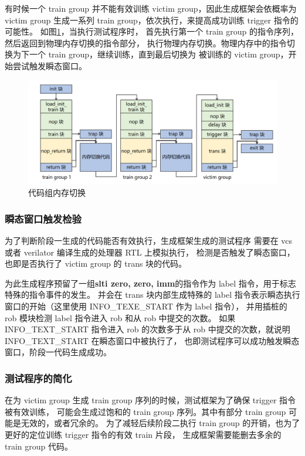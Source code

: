 有时候一个 train group 并不能有效训练 victim group，因此生成框架会依概率为 victim group
生成一系列 train group，依次执行，来提高成功训练 trigger 指令的可能性。
如图\ref{paper:memory-switch}，当执行测试程序时，
首先执行第一个 train group 的指令序列，然后返回到物理内存切换的指令部分，
执行物理内存切换。物理内存中的指令切换为下一个 train group，继续训练，直到最后切换为
被训练的 victim group，开始尝试触发瞬态窗口。\par

\begin{figure}[!h]
    \centering
    \includegraphics[width=\linewidth]{figure/paper/group-switch.png}
    \caption{代码组内存切换}
    \label{paper:memory-switch}
\end{figure}

\subsubsection{瞬态窗口触发检验}

为了判断阶段一生成的代码能否有效执行，生成框架生成的测试程序
需要在 vcs 或者 verilator 编译生成的处理器 RTL 上模拟执行，
检测是否触发了瞬态窗口，也即是否执行了 victim group 的 trans 块的代码。\par

为此生成程序预留了一组\textbf{slti zero, zero, imm}的指令作为 label 指令，用于标志特殊的指令事件的发生。
并会在 trans 块内部生成特殊的 label 指令表示瞬态执行窗口的开始（这里使用 INFO\_TEXE\_START 作为 label 指令），
并用插桩的 rob 模块检测 label 指令进入 rob 和从 rob 中提交的次数。
如果 INFO\_TEXT\_START 指令进入 rob 的次数多于从 rob 中提交的次数，就说明 INFO\_TEXT\_START 在瞬态窗口中被执行了，
也即测试程序可以成功触发瞬态窗口，阶段一代码生成成功。

\subsubsection{测试程序的简化}

在为 victim group 生成 train group 序列的时候，测试框架为了确保 trigger 指令被有效训练，
可能会生成过饱和的 train group 序列。其中有部分 train group 可能是无效的，或者冗余的。
为了减轻后续阶段二执行 train group 的开销，也为了更好的定位训练 trigger 指令的有效 train 片段，
生成框架需要能删去多余的 train group 代码。\par

